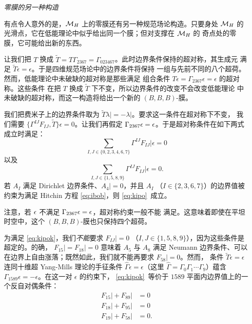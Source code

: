 \par\medskip\emph{零膜的另一种构造}

有点令人意外的是，${{{\mathcal{M}}}_H}$ 上的零膜还有另一种规范场论构造。只要身处
${{{\mathcal{M}}}_H}$ 的光滑点，它在低能理论中似乎给出同一个膜；但对支撑在 ${{{\mathcal{M}}}_H}$ 的
奇点处的零膜，它可能给出新的东西。

让我们把 $T$ 换成 $\tilde T = T
\Gamma_{2367}=\Gamma_{023467}$。此时边界条件保持的超对称，其生成元
满足 $\tilde T\epsilon=\epsilon$。于是四维规范场论中的边界条件将保持
一组与先前不同的八个超荷。然而，低能理论中未破缺的超对称是那些满足
组合条件 $T\epsilon=\Gamma_{2367}\epsilon=\epsilon$ 的超对称。这些条件
在把 $T$ 换成 $\tilde T$ 下不变，所以边界条件的改变不会改变低能理论
中未破缺的超对称，而这一构造将给出一个新的 $(B,B,B)$-膜。

我们把费米子上的边界条件取为
$\tilde T\lambda\vert = -\lambda\vert$。要求这一条件在超对称下不变，
我们需要 $\{\Gamma^{IJ}F_{IJ},\tilde T\}\epsilon=0$。让我们再假定
$\Gamma_{2367}\epsilon=\epsilon$。于是超对称条件在如下两式成立时满足：%
\setcounter{equation}{16}
\begin{equation}\label{eq:kipo}
\sum_{I,J\in
\{0,2,3,4,6,7\}}\Gamma^{IJ}F_{IJ}\vert\epsilon=0
\end{equation}
 以及
\setcounter{equation}{17}
\begin{equation}\label{eq:kipok}
\sum_{I,J\in
\{1,5,8,9\}}\Gamma^{IJ}F_{IJ}\vert\epsilon=0.
\end{equation}
 若 $A_I$ 满足 Dirichlet 边界条件、$A_4\vert=0$，并且 $A_I$
（$I\in \{2,3,6,7\}$）的边界值被约束为满足 Hitchin 方程
\eqref{eq:ibob}，则 \eqref{eq:kipo}\ 成立。

注意，若 $\epsilon$ 不满足 $\Gamma_{2367}\epsilon=\epsilon$，超对称约束一般不能
满足。这意味着即使在平坦时空中，这个 $(B,B,B)$-膜也只保持四个超荷。

为满足 \eqref{eq:kipok}，我们\emph{不能}要求 $F_{IJ}|=0$
（$I,J\in \{1,5,8,9\}$），因为这些条件是超定的。的确，
$F_{15}|=F_{18}|=0$ 意味着 $A_5$ 与 $A_8$ 满足 Neumann 边界条件、可以
在边界上自由涨落；既然如此，我们就不能再要求 $F_{58}|=0$。然而，
条件 $\tilde T\epsilon=\epsilon$ 连同十维超 Yang-Mills 理论的手征条件
$\hat\Gamma\epsilon=\epsilon$（这里
$\hat\Gamma=\Gamma_0\Gamma_1\cdots \Gamma_9$）蕴含
$\Gamma_{1589}\epsilon=-\epsilon$。在这一对 $\epsilon$ 的约束下，
\eqref{eq:kipok}\ 等价于 $1589$ 平面内边界值上的一个反自对偶条件：
\setcounter{equation}{18}
\begin{equation}\label{eq:ubb}
\begin{aligned}F_{15}\vert+F_{89}\vert & = 0 \\
                  F_{18}\vert+F_{95}\vert & = 0 \\
                  F_{19}\vert+F_{58}\vert & = 0. \\\end{aligned}
\end{equation}

